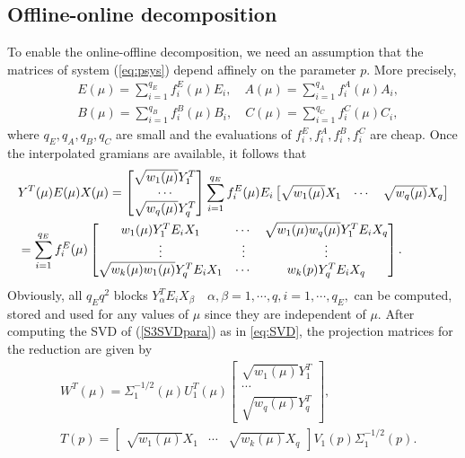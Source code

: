 \subsection{Offline-online decomposition}
To enable the online-offline decomposition, we need an assumption that the matrices of system (\ref{eq:psys}) depend affinely on the parameter $p$. More precisely,
\begin{align*}%
&E(\mu) = \sum\limits_{i=1}^{q_E}f_i^E(\mu)E_i,\quad A(\mu) = \sum\limits_{i=1}^{q_A}f_i^A(\mu)A_i,\\
&B(\mu) = \sum\limits_{i=1}^{q_B}f_i^B(\mu)B_i, \quad C(\mu) = \sum\limits_{i=1}^{q_C}f_i^C(\mu)C_i,
\end{align*}
where $q_E, q_A, q_B, q_C$ are small and the evaluations of $f_i^E,f_i^A,f_i^B,f_i^C$ are cheap. %
Once the interpolated gramians are available, %
 it follows that
\begin{align}\notag
&Y_{}^T(\mu)E(\mu)X_{}(\mu) = \begin{bmatrix}
\sqrt{w_1(\mu)}Y^{T}_{1}\\ \cdots \\ \sqrt{w_q(\mu)}Y^{T}_{q}
\end{bmatrix} \sum\limits_{i=1}^{q_E}f_i^E(\mu)E_i \begin{bmatrix}
\sqrt{w_1(\mu)}X_{1}&\cdots & \sqrt{w_q(\mu)}X_{q}
\end{bmatrix}\\ \label{S3SVDpara}
&= \sum\limits_{i=1}^{q_E}f_i^E(\mu) \begin{bmatrix}
w_1(\mu)Y^{T}_{1}E_iX_{1} &\cdots & \sqrt{w_1(\mu)w_q(\mu)}Y^{T}_{1}E_iX_{q}\\
\vdots & \vdots & \vdots \\
\sqrt{w_k(\mu)w_1(\mu)}Y^{T}_{q}E_iX_{1} & \cdots & 
w_k(p)Y^{T}_{q}E_iX_{q}
\end{bmatrix}.
\end{align}
Obviously, all $q_Eq^2$ blocks $Y^{T}_{\alpha}E_iX_{\beta} %
\quad \alpha, \beta = 1,\cdots,q, i=1,\cdots,q_E,$ can be computed, stored and used for any values of $\mu$ since they are independent of $\mu$. After computing the SVD of (\ref{S3SVDpara}) as in \eqref{eq:SVD}, the projection matrices for the reduction are given by
\begin{align*}%
&W^T(\mu) = \Sigma_1^{-1/2}(\mu)U_1^T(\mu)\begin{bmatrix}
\sqrt{w_1(\mu)}Y^{T}_{1}\\ \cdots \\ \sqrt{w_q(\mu)}Y^{T}_{q}
\end{bmatrix},\\
& T(p) = \begin{bmatrix}
\sqrt{w_1(\mu)}X_{1}&\cdots & \sqrt{w_k(\mu)}X_{q}
\end{bmatrix} V_1(p) \Sigma_1^{-1/2}(p). 
\end{align*}
